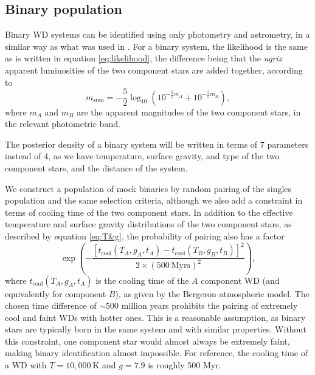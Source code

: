 \documentclass[fleqn,usenatbib]{mnras}
\newcommand{\Teff}{T}
\newcommand{\logg}{g}
\newcommand{\K}{\text{K}}
\begin{document}
\subsection{Binary population}

Binary WD systems can be identified using only photometry and astrometry, in a similar way as what was used in \cite{2018ApJ...857..114W}. For a binary system, the likelihood is the same as is written in equation \eqref{eq:likelihood}, the difference being that the \emph{ugriz} apparent luminosities of the two component stars are added together, according to
\begin{equation}
	m_\text{sum} = - \frac{5}{2}\log_{10}\left( 10^{-\frac{2}{5}m_{A}}+10^{-\frac{2}{5}m_{B}}  \right),
\end{equation}
where $m_A$ and $m_B$ are the apparent magnitudes of the two component stars, in the relevant photometric band.

The posterior density of a binary system will be written in terms of 7 parameters instead of 4, as we have temperature, surface gravity, and type of the two component stars, and the distance of the system.

We construct a population of mock binaries by random pairing of the singles population and the same selection criteria, although we also add a constraint in terms of cooling time of the two component stars. In addition to the effective temperature and surface gravity distributions of the two component stars, as described by equation \eqref{eq:T&g}, the probability of pairing also has a factor
\begin{equation}\label{eq:time_difference}
	\exp\left(
	-\frac{[t_\text{cool}(\Teff_A,\logg_A,t_A)-t_\text{cool}(\Teff_B,\logg_B,t_B)]^2}{2\times ( 500~\text{Myrs})^2}
	\right),
\end{equation}
where $t_\text{cool}(\Teff_A,\logg_A,t_A)$ is the cooling time of the $A$ component WD (and equivalently for component $B$), as given by the Bergeron atmospheric model. The chosen time difference of $\sim 500$ million years prohibits the pairing of extremely cool and faint WDs with hotter ones. This is a reasonable assumption, as binary stars are typically born in the same system and with similar properties. Without this constraint, one component star would almost always be extremely faint, making binary identification almost impossible. For reference, the cooling time of a WD with $\Teff=10,000~\K$ and $\logg=7.9$ is roughly 500 Myr.
\end{document}
